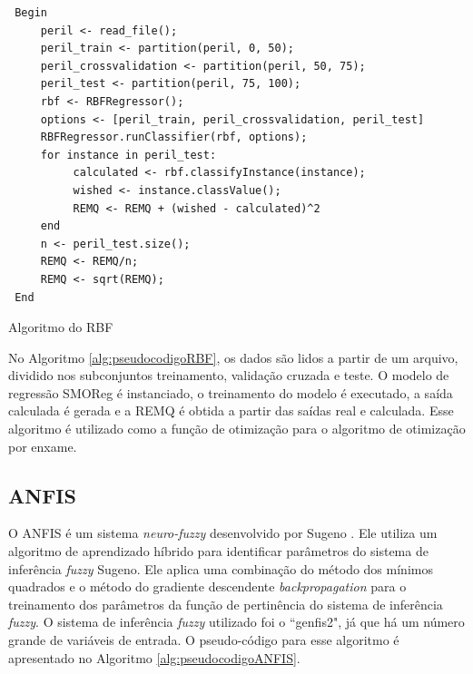 \begin{algorithm}[H]
\label{alg:pseudocodigoRBF}
\begin{verbatim}
 Begin
     peril <- read_file();
     peril_train <- partition(peril, 0, 50);
     peril_crossvalidation <- partition(peril, 50, 75);
     peril_test <- partition(peril, 75, 100);
     rbf <- RBFRegressor();
     options <- [peril_train, peril_crossvalidation, peril_test]
     RBFRegressor.runClassifier(rbf, options);
     for instance in peril_test:
          calculated <- rbf.classifyInstance(instance);
          wished <- instance.classValue();
          REMQ <- REMQ + (wished - calculated)^2
     end
     n <- peril_test.size();
     REMQ <- REMQ/n;
     REMQ <- sqrt(REMQ);
 End
\end{verbatim}
\caption{Algoritmo do RBF}
\end{algorithm} 
\bigskip

No Algoritmo \ref{alg:pseudocodigoRBF}, os dados são lidos a partir de um arquivo, dividido nos subconjuntos treinamento, validação cruzada e teste. O modelo de regressão SMOReg é instanciado, o treinamento do modelo é executado, a saída calculada é gerada e a REMQ é obtida a partir das saídas real e calculada. Esse algoritmo é utilizado como a função de otimização para o algoritmo de otimização por enxame.

\subsection{ANFIS}

O ANFIS é um sistema \textit{neuro-fuzzy} desenvolvido por Sugeno \cite{jang1997neuro}. Ele utiliza um algoritmo de aprendizado híbrido para identificar parâmetros do sistema de inferência \textit{fuzzy} Sugeno. Ele aplica uma combinação do método dos mínimos quadrados e o método do gradiente descendente \textit{backpropagation} para o treinamento dos parâmetros da função de pertinência do sistema de inferência \textit{fuzzy}. O sistema de inferência \textit{fuzzy} utilizado foi o ``genfis2", já que há um número grande de variáveis de entrada. O pseudo-código para esse algoritmo é apresentado no Algoritmo \ref{alg:pseudocodigoANFIS}.

